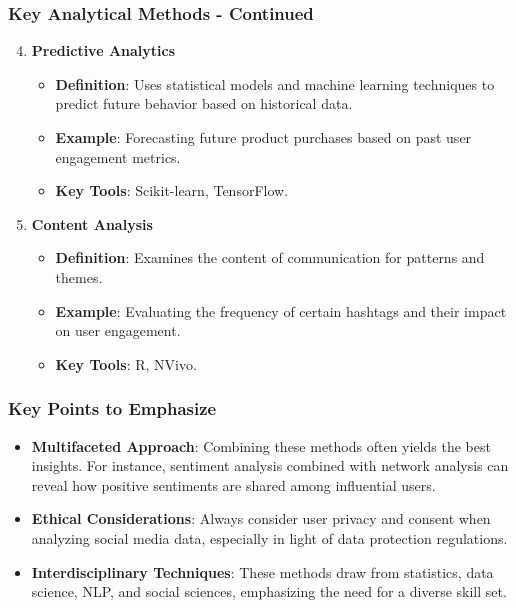 \documentclass{beamer}
\begin{document}
\begin{frame}[fragile]
    \frametitle{Key Analytical Methods - Continued}
    \begin{enumerate}
        \setcounter{enumi}{3}
        \item \textbf{Predictive Analytics}
        \begin{itemize}
            \item \textbf{Definition}: Uses statistical models and machine learning techniques to predict future behavior based on historical data.
            \item \textbf{Example}: Forecasting future product purchases based on past user engagement metrics.
            \item \textbf{Key Tools}: Scikit-learn, TensorFlow.
        \end{itemize}

        \item \textbf{Content Analysis}
        \begin{itemize}
            \item \textbf{Definition}: Examines the content of communication for patterns and themes.
            \item \textbf{Example}: Evaluating the frequency of certain hashtags and their impact on user engagement.
            \item \textbf{Key Tools}: R, NVivo.
        \end{itemize}
    \end{enumerate}
\end{frame}

\begin{frame}[fragile]
    \frametitle{Key Points to Emphasize}
    \begin{itemize}
        \item \textbf{Multifaceted Approach}: Combining these methods often yields the best insights. For instance, sentiment analysis combined with network analysis can reveal how positive sentiments are shared among influential users.
        
        \item \textbf{Ethical Considerations}: Always consider user privacy and consent when analyzing social media data, especially in light of data protection regulations.
        
        \item \textbf{Interdisciplinary Techniques}: These methods draw from statistics, data science, NLP, and social sciences, emphasizing the need for a diverse skill set.
    \end{itemize}
\end{frame}
\end{document}

